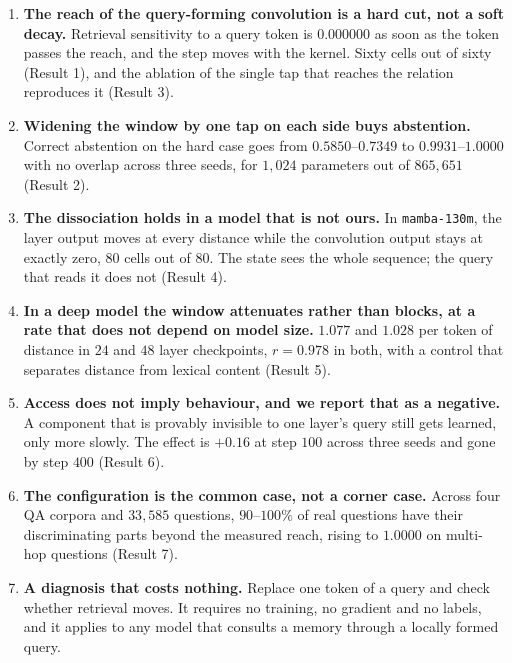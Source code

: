 \documentclass[11pt,a4paper]{article}
\begin{document}
\begin{enumerate}
\item \textbf{The reach of the query-forming convolution is a hard cut, not a soft decay.} Retrieval
sensitivity to a query token is $0.000000$ as soon as the token passes the reach, and the step moves
with the kernel. Sixty cells out of sixty (Result 1), and the ablation of the single tap that reaches
the relation reproduces it (Result 3).

\item \textbf{Widening the window by one tap on each side buys abstention.} Correct abstention on the
hard case goes from $0.5850$--$0.7349$ to $0.9931$--$1.0000$ with no overlap across three seeds, for
$1{,}024$ parameters out of $865{,}651$ (Result 2).

\item \textbf{The dissociation holds in a model that is not ours.} In \texttt{mamba-130m}, the layer
output moves at every distance while the convolution output stays at exactly zero, $80$ cells out of
$80$. The state sees the whole sequence; the query that reads it does not (Result 4).

\item \textbf{In a deep model the window attenuates rather than blocks, at a rate that does not depend
on model size.} $1.077$ and $1.028$ per token of distance in $24$ and $48$ layer checkpoints,
$r = 0.978$ in both, with a control that separates distance from lexical content (Result 5).

\item \textbf{Access does not imply behaviour, and we report that as a negative.} A component that is
provably invisible to one layer's query still gets learned, only more slowly. The effect is
$+0.16$ at step $100$ across three seeds and gone by step $400$ (Result 6).

\item \textbf{The configuration is the common case, not a corner case.} Across four QA corpora and
$33{,}585$ questions, $90$--$100\%$ of real questions have their discriminating parts beyond the
measured reach, rising to $1.0000$ on multi-hop questions (Result 7).

\item \textbf{A diagnosis that costs nothing.} Replace one token of a query and check whether
retrieval moves. It requires no training, no gradient and no labels, and it applies to any model that
consults a memory through a locally formed query.
\end{enumerate}
\end{document}
